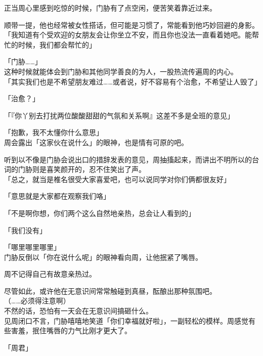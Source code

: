 正当周心里感到吃惊的时候，门胁有了点空闲，便苦笑着靠近过来。

顺带一提，他也经常被女性搭话，但可能是习惯了，常能看到他巧妙回避的身影。\\

「我知道有个受欢迎的女朋友会让你坐立不安，而且你也没法一直看着她吧。能帮忙的时候，我们都会帮忙的」

「门胁……」\\

这种时候就能体会到门胁和其他同学善良的为人，一股热流传遍周的内心。\\

「其实我们也是不希望朋友难过……或者说，好不容易有个治愈，不希望让人毁了」

「治愈？」

「『你丫别去打扰两位酸酸甜甜的气氛和关系啊』这差不多是全班的意见」

「抱歉，我不太懂你什么意思」\\

周会露出「这家伙在说什么」的眼神，也是情有可原的吧。

听到以不像是门胁会说出口的措辞发表的意见，周抽搐起来，而讲出不明所以的台词的门胁则是喜笑颜开的，忍不住笑出了声。\\

「总之，就当是椎名很受大家喜爱吧，也可以说同学对你们俩都很友好」

「意思就是大家都在观察我们咯」

「不是啊你想，你们两个这么自然地亲热，总会让人看到的」

「我们没有」

「哪里哪里哪里」\\

门胁反倒以「你在说什么呢」的眼神看向周，让他抿紧了嘴唇。

周不记得自己有故意亲热过。

尽管如此，或许他在无意识间常常触碰到真昼，酝酿出那种氛围吧。\\

（……必须得注意啊）\\

不然的话，恐怕有一天会在无意识间搞砸什么。\\

见周闭口不言，门胁嘻嘻地笑道「你们幸福就好啦」，一副轻松的模样。周感觉有些害羞，抿住嘴唇的力气比刚才更大了。\\

\vspace{2\baselineskip}

「周君」\\

